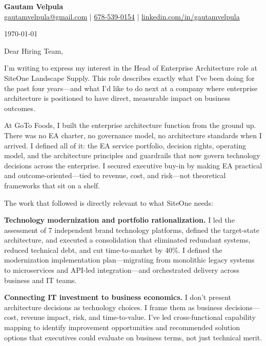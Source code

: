 \documentclass[11pt]{article}
\begin{document}
\begin{center}
    {\LARGE \textbf{Gautam Velpula}} \\[6pt]
    \href{mailto:gautamvelpula@gmail.com}{gautamvelpula@gmail.com} \;|\;
    \href{tel:6785390154}{678-539-0154} \;|\;
    \href{https://www.linkedin.com/in/gautamvelpula}{linkedin.com/in/gautamvelpula}
\end{center}

\vspace{14pt}

\today

\vspace{8pt}

Dear Hiring Team,

I'm writing to express my interest in the Head of Enterprise Architecture role at SiteOne Landscape Supply. This role describes exactly what I've been doing for the past four years---and what I'd like to do next at a company where enterprise architecture is positioned to have direct, measurable impact on business outcomes.

At GoTo Foods, I built the enterprise architecture function from the ground up. There was no EA charter, no governance model, no architecture standards when I arrived. I defined all of it: the EA service portfolio, decision rights, operating model, and the architecture principles and guardrails that now govern technology decisions across the enterprise. I secured executive buy-in by making EA practical and outcome-oriented---tied to revenue, cost, and risk---not theoretical frameworks that sit on a shelf.

The work that followed is directly relevant to what SiteOne needs:

\textbf{Technology modernization and portfolio rationalization.} I led the assessment of 7 independent brand technology platforms, defined the target-state architecture, and executed a consolidation that eliminated redundant systems, reduced technical debt, and cut time-to-market by 40\%. I defined the modernization implementation plan---migrating from monolithic legacy systems to microservices and API-led integration---and orchestrated delivery across business and IT teams.

\textbf{Connecting IT investment to business economics.} I don't present architecture decisions as technology choices. I frame them as business decisions---cost, revenue impact, risk, and time-to-value. I've led cross-functional capability mapping to identify improvement opportunities and recommended solution options that executives could evaluate on business terms, not just technical merit.
\end{document}
